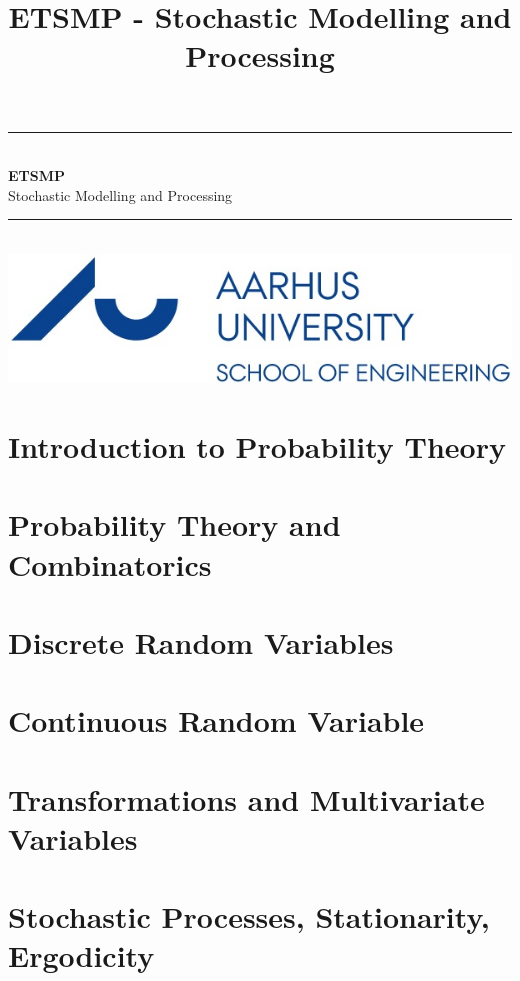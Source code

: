 \documentclass[12pt,a4paper,danish]{book}
\title{ETSMP -  Stochastic Modelling and Processing}
\newcommand{\HRule}{\rule{\linewidth}{0.5mm}}
\begin{document}
\begin{titlepage}
	\clearpage\thispagestyle{empty}

	\begin{center}
		\HRule \\[0.4cm]
		{\huge \bfseries ETSMP} \\[.3cm] {\huge Stochastic Modelling and Processing}\\[0cm]
		\HRule \\[3.4cm]
		\includegraphics[width=0.5\linewidth]{graphics/au}
	\end{center}
	\renewcommand{\contentsname}{Indholdsfortegnelse}
	\tableofcontents

\end{titlepage}
 

\chapter{Introduction to Probability Theory}



\chapter{Probability Theory and Combinatorics}


\chapter{Discrete Random Variables}


\chapter{Continuous Random Variable}


\chapter{Transformations and Multivariate Variables}


\chapter{Stochastic Processes, Stationarity, Ergodicity}
\end{document}
